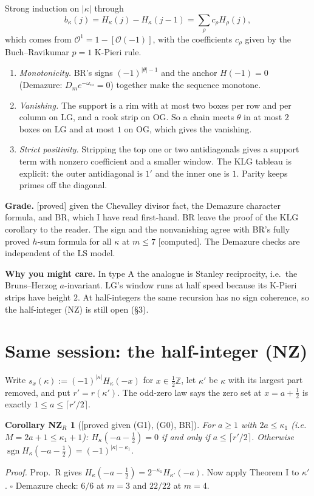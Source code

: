 \documentclass[10pt]{amsart}
\newcommand{\grade}[1]{\textsf{[#1]}}
\newcommand{\LG}{\mathrm{LG}}
\newcommand{\OG}{\mathrm{OG}}
\newtheorem*{corNZ}{Corollary NZ$_R$}
\begin{document}
Strong induction on $|\kappa|$ through
\[ b_\kappa(j)=H_\kappa(j)-H_\kappa(j-1)=\sum_\rho c_\rho H_\rho(j), \tag{$\star$}\]
which comes from $\mathcal O^1=1-[\mathcal O(-1)]$, with the coefficients $c_\rho$ given by the Buch--Ravikumar $p=1$
K-Pieri rule.
\begin{enumerate}[label=\arabic*.]
\item \emph{Monotonicity.} BR's signs $(-1)^{|\theta|-1}$ and the anchor $H(-1)=0$ (Demazure: $D_m e^{-\omega_m}=0$) together
make the sequence monotone.
\item \emph{Vanishing.} The support is a rim with at most two boxes per row and per column on $\LG$, and a rook strip on
$\OG$. So a chain meets $\theta$ in at most $2$ boxes on $\LG$ and at most $1$ on $\OG$, which gives the vanishing.
\item \emph{Strict positivity.} Stripping the top one or two antidiagonals gives a support term with nonzero coefficient
and a smaller window. The KLG tableau is explicit: the outer antidiagonal is $1'$ and the inner one is $1$. Parity keeps
primes off the diagonal.
\end{enumerate}

\textbf{Grade.} \grade{proved} given the Chevalley divisor fact, the Demazure character formula, and BR, which I have read
first-hand. BR leave the proof of the KLG corollary to the reader. The sign and the nonvanishing agree with BR's fully proved
$h$-sum formula for all $\kappa$ at $m\le 7$ \grade{computed}. The Demazure checks are independent of the LS model.

\textbf{Why you might care.} In type A the analogue is Stanley reciprocity, i.e.\ the Bruns--Herzog $a$-invariant. $\LG$'s
window runs at half speed because its K-Pieri strips have height $2$. At half-integers the same recursion has no sign
coherence, so the half-integer (NZ) is still open (\S3).

\section{Same session: the half-integer (NZ)}

Write $s_x(\kappa):=(-1)^{|\kappa|}H_\kappa(-x)$ for $x\in\tfrac12\mathbb Z$, let $\kappa'$ be $\kappa$ with its largest part
removed, and put $r'=r(\kappa')$. The odd-zero law says the zero set at $x=a+\tfrac12$ is exactly $1\le a\le\lceil r'/2\rceil$.

\begin{corNZ}[\grade{proved given (G1), (G0), BR}]
For $a\ge1$ with $2a\le\kappa_1$ (i.e.\ $M=2a+1\le\kappa_1+1$): $H_\kappa(-a-\tfrac12)=0$ if and only if
$a\le\lceil r'/2\rceil$. Otherwise $\operatorname{sgn}H_\kappa(-a-\tfrac12)=(-1)^{|\kappa|-\kappa_1}$.
\end{corNZ}
\emph{Proof.} Prop.~R gives $H_\kappa(-a-\tfrac12)=2^{-\kappa_1}H_{\kappa'}(-a)$. Now apply Theorem I to $\kappa'$. $\square$
\quad Demazure check: $6/6$ at $m=3$ and $22/22$ at $m=4$.
\end{document}
